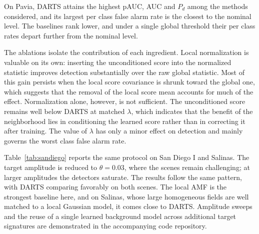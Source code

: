 


On Pavia, DARTS attains the highest pAUC, AUC and $P_d$ among the methods
considered, and its largest per class false alarm rate is the closest to
the nominal level. The baselines rank lower, and under a single global
threshold their per class rates depart further from the nominal level.

The ablations isolate the contribution of each ingredient. Local
normalization is valuable on its own: inserting the unconditioned score
into the normalized statistic improves detection substantially over the raw
global statistic. Most of this gain persists when the local score
covariance is shrunk toward the global one, which suggests that the removal
of the local score mean accounts for much of the effect. Normalization
alone, however, is not sufficient. The unconditioned score remains well
below DARTS at matched $\lambda$, which indicates that the benefit of the
neighborhood lies in conditioning the learned score rather than in
correcting it after training. The value of $\lambda$ has only a minor
effect on detection and mainly governs the worst class false alarm rate.




Table~\ref{tab:sandiego} reports the same protocol on San Diego I and
Salinas. The target amplitude is reduced to $\theta=0.03$, where the scenes
remain challenging; at larger amplitudes the detectors saturate.
The results follow the same pattern, with DARTS comparing favorably on
both scenes. The local AMF is the strongest baseline here, and on Salinas,
whose large homogeneous fields are well matched to a local Gaussian model,
it comes close to DARTS. Amplitude sweeps and the reuse of a single learned
background model across additional target signatures are demonstrated in the
accompanying code repository.